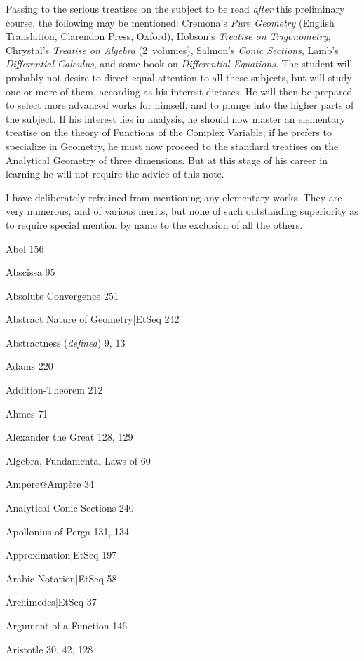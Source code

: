 \documentclass[12pt,leqno]{book}[2005/09/16]
\newcommand{\Title}[1]{\textit{#1}}
\begin{document}
Passing to the serious treatises on the subject to be read
\emph{after} this preliminary course, the following may be mentioned:
Cremona's \Title{Pure Geometry} (English Translation,
Clarendon Press, Oxford), Hobson's \Title{Treatise on Trigonometry},
Chrystal's \Title{Treatise on Algebra} (2~volumes), Salmon's
\Title{Conic Sections}, Lamb's \Title{Differential Calculus}, and some
book on \Title{Differential Equations}. The student will probably
not desire to direct equal attention to all these subjects,
but will study one or more of them, according as his interest
dictates. He will then be prepared to select more advanced
works for himself, and to plunge into the higher
parts of the subject. If his interest lies in analysis, he
should now master an elementary treatise on the theory
of Functions of the Complex Variable; if he prefers to
specialize in Geometry, he must now proceed to the
standard treatises on the Analytical Geometry of three
dimensions. But at this stage of his career in learning
he will not require the advice of this note.

I have deliberately refrained from mentioning any
elementary works. They are very numerous, and of
various merits, but none of such outstanding superiority
as to require special mention by name to the exclusion
of all the others.


\printindex
\iffalse

Abel 156

Abscissa 95

Absolute Convergence 251

Abstract Nature of Geometry|EtSeq 242

Abstractness (\emph{defined}) 9, 13

Adams 220

Addition-Theorem 212

Ahmes 71

Alexander the Great 128, 129

Algebra, Fundamental Laws of 60

Ampere@Ampère 34

Analytical Conic Sections 240

Apollonius of Perga 131, 134

Approximation|EtSeq 197

Arabic Notation|EtSeq 58

Archimedes|EtSeq 37

Argument of a Function 146

Aristotle 30, 42, 128
\end{document}
